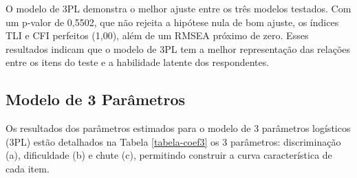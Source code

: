 O modelo de 3PL demonstra o melhor ajuste entre os três modelos testados. Com um p-valor de 0,5502, que não rejeita a hipótese nula de bom ajuste, os índices TLI e CFI perfeitos (1,00), além de um RMSEA próximo de zero. Esses resultados indicam que o modelo de 3PL tem a melhor representação das relações entre os itens do teste e a habilidade latente dos respondentes.


\subsection{Modelo de 3 Parâmetros}

Os resultados dos parâmetros estimados para o modelo de 3 parâmetros logísticos (3PL) estão detalhados na Tabela \ref{tabela-coef3} os 3 parâmetros: discriminação (a), dificuldade (b) e chute (c), permitindo construir a curva característica de cada item. 

